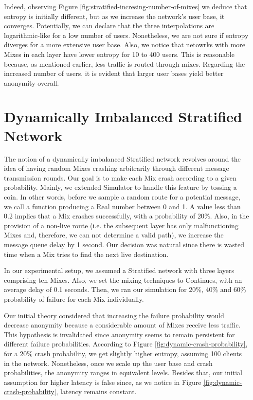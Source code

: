 \documentclass[logo,msc,cyber]{infthesis}   %
\begin{document}
Indeed, observing Figure \ref{fig:stratified-incresing-number-of-mixes} we
deduce that entropy is initially different, but as we increase the network's
user base, it converges. Potentially, we can declare that the three
interpolations are logarithmic-like for a low number of users. Nonetheless, we
are not sure if entropy diverges for a more extensive user base. Also, we notice
that netowrks with more Mixes in each layer have lower entropy for 10 to 400
users. This is reasonable because, as mentioned earlier, less traffic is routed
through mixes. Regarding the increased number of users, it is evident that
larger user bases yield better anonymity overall.


\section{Dynamically Imbalanced Stratified Network}
The notion of a dynamically imbalanced Stratified network revolves around the
idea of having random Mixes crashing arbitrarily through different message
transmission rounds. Our goal is to make each Mix crash according to a given
probability. Mainly, we extended Simulator to handle this feature by tossing a
coin. In other words, before we sample a random route for a potential message,
we call a function producing a Real number between 0 and 1. A value less than
0.2 implies that a Mix crashes successfully, with a probability of 20\%. Also,
in the provision of a non-live route (i.e. the subsequent layer has only
malfunctioning Mixes and, therefore, we can not determine a valid path), we
increase the message queue delay by 1 second. Our decision was natural since
there is wasted time when a Mix tries to find the next live destination.

In our experimental setup, we assumed a Stratified network with three layers
comprising ten Mixes. Also, we set the mixing techniques to Continues, with an
average delay of 0.1 seconds. Then, we ran our simulation for 20\%, 40\% and 60\%
probability of failure for each Mix individually. 

Our initial theory considered that increasing the failure probability would
decrease anonymity because a considerable amount of Mixes receive less traffic.
This hypothesis is invalidated since anonymity seems to remain persistent for
different failure probabilities. According to Figure
\ref{fig:dynamic-crash-probability}, for a 20\% crash probability, we get
slightly higher entropy, assuming 100 clients in the network. Nonetheless, once
we scale up the user base and crash probabilities, the anonymity ranges in
equivalent levels. Besides that, our initial assumption for higher latency is
false since, as we notice in Figure \ref{fig:dynamic-crash-probability}, latency
remains constant. 
\end{document}
